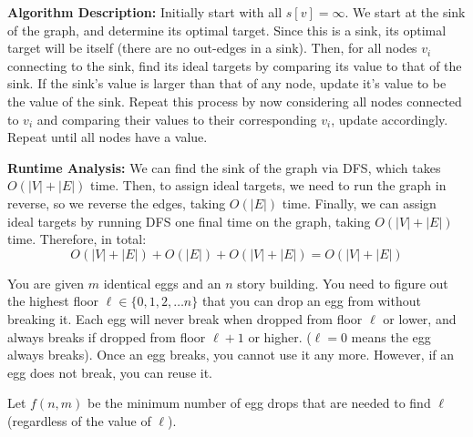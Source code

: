 \documentclass[11pt]{article}
\begin{document}
\begin{solution}

	\textbf{Algorithm Description:} Initially start with all $s[v] = \infty$. 
	We start at the sink of the graph, and determine its optimal target. Since 
	this is a sink, its optimal target will be itself (there are no out-edges in a sink). Then, for all 
	nodes $v_i$ connecting to the sink, find its ideal targets by comparing its value to that of the sink. If 
	the sink's value is larger than that of any node, update it's value to be the value of the sink. Repeat 
	this process by now considering all nodes connected to $v_i$ and comparing their values to their 
	corresponding $v_i$, update accordingly. Repeat until all nodes have a value.

	\textbf{Runtime Analysis:} We can find the sink of the graph via DFS, which takes \( O(|V| + |E|) \) time. 
	Then, to assign ideal targets, we need to run the graph in reverse, so we reverse the edges, taking 
	\( O(|E|) \) time. Finally, we can assign ideal targets by running DFS one final time on the graph, taking
	\( O(|V| + |E|) \) time. Therefore, in total:
	\[
		O(|V| + |E|) + O(|E|) + O(|V| + |E|) = O(|V| + |E|)
	\]


\end{solution}
\newpage


You are given $m$ identical eggs and an $n$ story
building. You need to figure out the highest floor
$\ell \in \{0, 1, 2, \ldots n\}$ that you can drop an egg from without
breaking it. Each egg will never break when dropped from floor $\ell$ or lower, and always breaks if dropped from floor $\ell+1$ or higher. ($\ell = 0$ means the egg always breaks). Once an egg breaks, you cannot use it any more. However, if an egg does not break, you can reuse it.

Let $f(n, m)$ be the minimum number of egg drops that are needed to find $\ell$ (regardless of the value of $\ell$).
\end{document}
